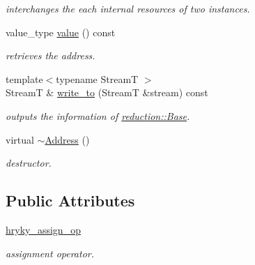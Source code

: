 \begin{DoxyCompactItemize}
\begin{DoxyCompactList}\small\item\em interchanges the each internal resources of two instances. \end{DoxyCompactList}\item 
\hypertarget{classhryky_1_1reduction_1_1_address_a949fd4c7bef03419550491b9c2d46801}{value\-\_\-type \hyperlink{classhryky_1_1reduction_1_1_address_a949fd4c7bef03419550491b9c2d46801}{value} () const }\label{classhryky_1_1reduction_1_1_address_a949fd4c7bef03419550491b9c2d46801}

\begin{DoxyCompactList}\small\item\em retrieves the address. \end{DoxyCompactList}\item 
\hypertarget{classhryky_1_1reduction_1_1_base_a709cc7c48e1c90fe253739e46d82aa19}{{\footnotesize template$<$typename Stream\-T $>$ }\\Stream\-T \& \hyperlink{classhryky_1_1reduction_1_1_base_a709cc7c48e1c90fe253739e46d82aa19}{write\-\_\-to} (Stream\-T \&stream) const }\label{classhryky_1_1reduction_1_1_base_a709cc7c48e1c90fe253739e46d82aa19}

\begin{DoxyCompactList}\small\item\em outputs the information of \hyperlink{classhryky_1_1reduction_1_1_base}{reduction\-::\-Base}. \end{DoxyCompactList}\item 
\hypertarget{classhryky_1_1reduction_1_1_address_a1baa7156bd4b8738ebcb9cc96a906a2d}{virtual \hyperlink{classhryky_1_1reduction_1_1_address_a1baa7156bd4b8738ebcb9cc96a906a2d}{$\sim$\-Address} ()}\label{classhryky_1_1reduction_1_1_address_a1baa7156bd4b8738ebcb9cc96a906a2d}

\begin{DoxyCompactList}\small\item\em destructor. \end{DoxyCompactList}\end{DoxyCompactItemize}
\subsection*{Public Attributes}
\begin{DoxyCompactItemize}
\item 
\hypertarget{classhryky_1_1reduction_1_1_address_ae7557ca1857224e2691ad2e8955ce317}{\hyperlink{classhryky_1_1reduction_1_1_address_ae7557ca1857224e2691ad2e8955ce317}{hryky\-\_\-assign\-\_\-op}}\label{classhryky_1_1reduction_1_1_address_ae7557ca1857224e2691ad2e8955ce317}

\begin{DoxyCompactList}\small\item\em assignment operator. \end{DoxyCompactList}\end{DoxyCompactItemize}
